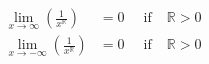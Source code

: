 \begin{equation}
\begin{split}
    \lim_{x \to \infty} \left( \frac{1}{x^{\mathbb{R}}} \right) &= 0 &\;\; \text{if} &\; \mathbb{R} > 0 \\
    \lim_{x \to -\infty} \left( \frac{1}{x^{\mathbb{R}}} \right) &= 0 &\;\; \text{if} &\; \mathbb{R} > 0
\end{split}
\end{equation}